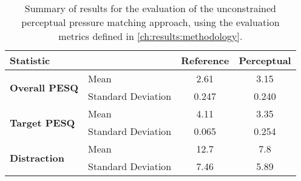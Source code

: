 \begin{table}[]
    \centering
\begin{tabular}{|l|l|c|c|}
\hline
\multicolumn{2}{|l|}{Statistic}                                                  
& \multicolumn{1}{l|}{\textbf{Reference}} & \multicolumn{1}{l|}{\textbf{Perceptual}} \\ \hline
\multicolumn{1}{|c|}{\multirow{2}{*}{\textbf{Overall PESQ}}} 
& Mean               & 2.61                                    & 3.15                                     \\ \cline{2-4} 
\multicolumn{1}{|c|}{}                                      
& Standard Deviation & 0.247                                   & 0.240                                    \\ \hline
\multirow{2}{*}{\textbf{Target PESQ}}                        
& Mean               & 4.11                                    & 3.35                                     \\ \cline{2-4} 
& Standard Deviation & 0.065                                   & 0.254                                    \\ \hline
\multirow{2}{*}{\textbf{Distraction}}                       
& Mean               & 12.7                                    & 7.8                                      \\ \cline{2-4} 
& Standard Deviation & 7.46                                    & 5.89                                     \\ \hline
\end{tabular}
\caption{
    Summary of results for the evaluation of the unconstrained perceptual pressure matching approach,
    using the evaluation metrics defined in \autoref{ch:results:methodology}.
}
\label{ch:results:results:unconstrained_results}
\end{table}

